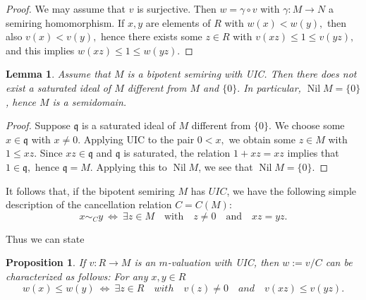 \documentclass [12pt,a4paper,reqno]{amsart}
\newtheorem{lemma}[thm]{Lemma}
\newtheorem{prop}[thm]{Proposition}
\begin{document}
\begin{proof} We may assume that $v$ is surjective. Then
$w={\gamma} \circ v$ with ${\gamma} : M\to N$ a semiring homomorphism. If
$x,y$ are elements of $R$ with $w(x)<w(y),$ then also $v(x)<v(y),$
hence there exists some $z\in R$ with $v(xz)\le 1\le v(yz),$ and
this implies $w(xz)\le 1\le w(yz).$\end{proof}

\begin{lemma}\label{lem2.5}
Assume that $M$ is a bipotent semiring with UIC. Then there does
not exist a saturated ideal of $M$ different from $M$ and $\{0\}.$
In particular,  ${\operatorname{Nil}} M = \{ 0 \}$,  hence $M$ is a
semidomain.\end{lemma}

\begin{proof}
Suppose ${\mathfrak q}$ is a saturated ideal of $M$ different from $\{0\}.$
We choose some $x\in{\mathfrak q}$ with $x\ne 0.$ Applying UIC to the pair
$0<x,$ we obtain some $z\in M$ with $1\le xz.$ Since $xz\in{\mathfrak q}$
and ${\mathfrak q}$ is saturated, the relation $1+xz=xz$ implies that
$1\in{\mathfrak q},$ hence ${\mathfrak q}=M.$ Applying this to $ {\operatorname{Nil}} M$, we see
that ${\operatorname{Nil}} M=\{0\}.$
\end{proof}

It follows that, if the bipotent semiring $M$ has $UIC$, we have
the following simple description of the cancellation relation
$C=C(M):$
\begin{equation}\label{2.2}
x\sim_C y {\ {\Leftrightarrow} \ } \exists z\in M\quad\text{with}\quad
z\ne0\quad\text{and}\quad xz=yz.
\end{equation}

Thus we can state
\begin{prop}\label{prop2.6}
If $v:R\to M$ is an $m$-valuation with UIC, then $w:=v/C$ can be
characterized as follows: For any $x,y\in R$
$$w(x)\le w(y) {\ {\Leftrightarrow} \ } \exists z\in R\quad{with}\quad
v(z)\ne0\quad{and}\quad v(xz)\le v(yz).
$$
\end{prop}
\end{document}
